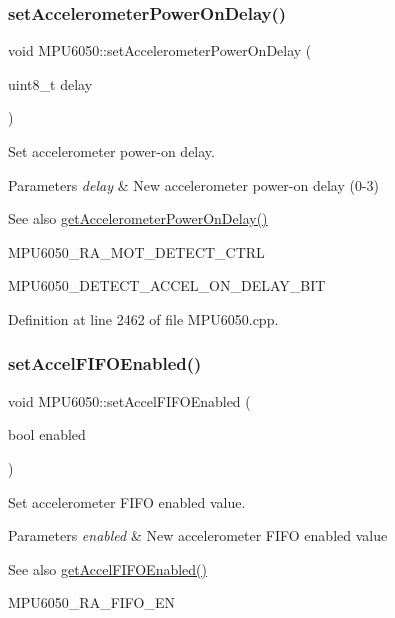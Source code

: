 \subsubsection{\texorpdfstring{setAccelerometerPowerOnDelay()}{setAccelerometerPowerOnDelay()}}
{\footnotesize\ttfamily void M\+P\+U6050\+::set\+Accelerometer\+Power\+On\+Delay (\begin{DoxyParamCaption}\item[{uint8\+\_\+t}]{delay }\end{DoxyParamCaption})}



Set accelerometer power-\/on delay. 


\begin{DoxyParams}{Parameters}
{\em delay} & New accelerometer power-\/on delay (0-\/3) \\
\hline
\end{DoxyParams}
\begin{DoxySeeAlso}{See also}
\mbox{\hyperlink{classMPU6050_aae903df2accc687423f9cd0a78f9cd32}{get\+Accelerometer\+Power\+On\+Delay()}} 

M\+P\+U6050\+\_\+\+R\+A\+\_\+\+M\+O\+T\+\_\+\+D\+E\+T\+E\+C\+T\+\_\+\+C\+T\+RL 

M\+P\+U6050\+\_\+\+D\+E\+T\+E\+C\+T\+\_\+\+A\+C\+C\+E\+L\+\_\+\+O\+N\+\_\+\+D\+E\+L\+A\+Y\+\_\+\+B\+IT 
\end{DoxySeeAlso}


Definition at line 2462 of file M\+P\+U6050.\+cpp.

\mbox{\label{classMPU6050_afccbee85f5cdc95098f6d62d8d417c3f}} 
\subsubsection{\texorpdfstring{setAccelFIFOEnabled()}{setAccelFIFOEnabled()}}
{\footnotesize\ttfamily void M\+P\+U6050\+::set\+Accel\+F\+I\+F\+O\+Enabled (\begin{DoxyParamCaption}\item[{bool}]{enabled }\end{DoxyParamCaption})}



Set accelerometer F\+I\+FO enabled value. 


\begin{DoxyParams}{Parameters}
{\em enabled} & New accelerometer F\+I\+FO enabled value \\
\hline
\end{DoxyParams}
\begin{DoxySeeAlso}{See also}
\mbox{\hyperlink{classMPU6050_ace244415128ad7a38293ad6808b7face}{get\+Accel\+F\+I\+F\+O\+Enabled()}} 

M\+P\+U6050\+\_\+\+R\+A\+\_\+\+F\+I\+F\+O\+\_\+\+EN 
\end{DoxySeeAlso}


